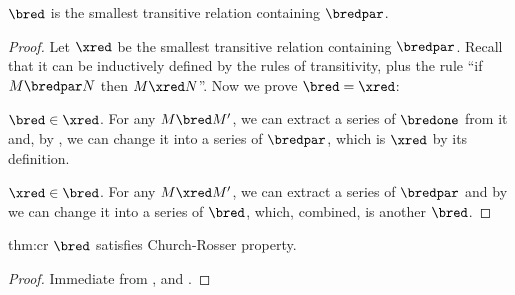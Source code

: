 \documentclass[../../../include/open-logic-section]{subfiles}
\begin{document}
\begin{lem}
  $\bred$ is the smallest transitive relation containing $\bredpar$.
\end{lem}
\begin{proof}
  Let $\xred$ be the smallest transitive relation containing $\bredpar$.
  Recall that it can be inductively defined by the rules of transitivity, plus the rule ``if
  $M \bredpar N$ then $M \xred N$''. Now we prove $\bred = \xred$:
  
  $\bred \in \xred$. For any $M \bred M'$, we can extract a series of
  $\bredone$ from it and, by , we can change it
  into a series of $\bredpar$, which is $\xred$ by its definition.

  $\xred \in \bred$. For any $M \xred M'$, we can extract a series of
  $\bredpar$ and by  we can change it into a series
  of $\bred$, which, combined, is another $\bred$.
\end{proof}

\begin{thm}{thm:cr}
  $\bred$ satisfies Church-Rosser property.
\end{thm}
\begin{proof}
  Immediate from ,  and .
\end{proof}
\end{document}
